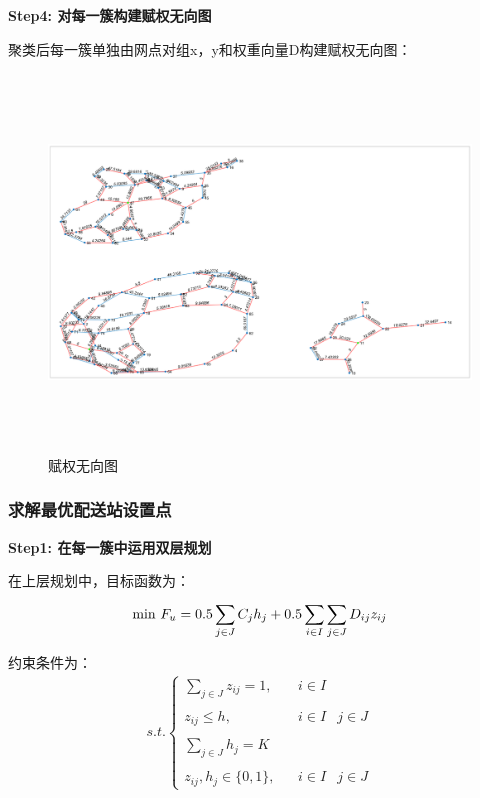 \documentclass[withoutpreface,bwprint]{cumcmthesis} %
\begin{document}
	\textbf{Step4: 对每一簇构建赋权无向图}
	
	聚类后每一簇单独由网点对组x，y和权重向量D构建赋权无向图：
	
	\begin{figure}[htbp]
		\centering
		\includegraphics[height=10cm, width=16cm]{cluster3_red_G1.eps}
		\caption{赋权无向图}
		\label{fig:赋权无向图1}
	\end{figure}
	
	\subsubsection{求解最优配送站设置点}
	
	\textbf{Step1: 在每一簇中运用双层规划}
	
	在上层规划中，目标函数为：
	\begin{align*}
		{\rm{min}}~{F_u} = 0.5\sum\limits_{j \in J}^{} {{C_{j}}} {h_j} + 0.5\sum\limits_{i \in I}^{} {\sum\limits_{j \in J}^{} {{D_{ij}}} } {z_{ij}}
	\end{align*}
	
	约束条件为：
	\begin{align*}
			s.t.\left \{{\begin{matrix}\sum_{j\in J}^{}{{{z}_{ij}}}=1,&&i\in I&\\&&&\\{{z}_{ij}}≤h,&&i\in I&j\in J\\&&&\\\sum_{j\in J}^{}{{{h}_{j}}=K}&&&\\&&&\\{{z}_{ij}},{{h}_{j}}\in \{0,1\},&&i\in I&j\in J\end{matrix}}\right .
	\end{align*}
	
\end{document}
